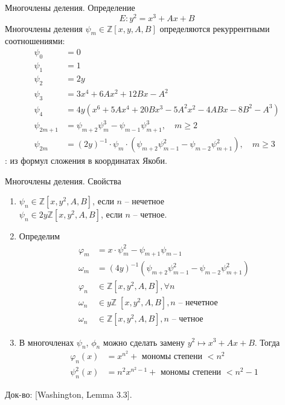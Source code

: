 \documentclass{beamer}
\begin{document}
\begin{frame}{Многочлены деления. Определение}
\[E: y^2 = x^3 + A x + B \]
Многочлены деления ${\psi _m} \in \mathbb{Z}[ {x,y,A,B}]$ определяются рекуррентными соотношениями:
\begin{align*}
    {\psi _0} &= 0 \\
    {\psi _1} &= 1 \\
    {\psi _2} &= 2y \\
    {\psi _3} &= 3{x^4} + 6A{x^2} + 12Bx - {A^2} \\
    {\psi _4} &= 4{y}\left( {{x^6} + 5A{x^4} + 20B{x^3} - 5{A^2}{x^2} - 4ABx - 8{B^2} - {A^3}} \right) \\
    {\psi _{2m + 1}} &= {\psi _{m + 2}}\psi _m^3 - {\psi _{m - 1}}\psi _{m + 1}^3, \quad m \geqslant 2 \\
    {\psi _{2m}} &= {\left( {2y} \right)^{ - 1}} \cdot {\psi _m} \cdot \left( {{\psi _{m + 2}}\psi _{m - 1}^2 - {\psi _{m - 2}}\psi _{m + 1}^2} \right),\quad m \geqslant 3
\end{align*}
: из формул сложения в координатах Якоби.
\end{frame}



\begin{frame}{Многочлены деления. Свойства}
\begin{enumerate}
    \item 
    ${\psi _n} \in \mathbb{Z}[x, y^2, A, B]$, если $n$ -- нечетное \\
    ${\psi _n} \in 2y\mathbb{Z}[x, y^2, A, B]$, если $n$ -- четное. 
    \item Определим
    \begin{align*}
        {\varphi _m} &= x \cdot \psi _m^2 - {\psi _{m + 1}}{\psi _{m - 1}} \\
        {\omega _m} &= {\left( {4y} \right)^{ - 1}}\left( {{\psi _{m + 2}}\psi _{m - 1}^2 - {\psi _{m - 2}}\psi _{m + 1}^2} \right) \\
        {\varphi _n} &\in \mathbb{Z}\left[ {x, {y^2},A,B} \right], \forall n \\
        {\omega _n} &\in y\mathbb{Z}\;\left[ {x, {y^2},A,B} \right], n{\text{  --  нечетное}} \\
        {\omega _n} &\in \mathbb{Z}\left[ {x, {y^2},A,B} \right],n{\text{ -- четное}}
    \end{align*}
    
    
    \item В многочленах ${\psi _n}$, ${\phi _n}$ можно сделать замену ${y^2} \mapsto {x^3} + Ax + B$. %
    Тогда 
    \begin{align*}
        {\varphi _n}\left( x \right) &= {x^{{n^2}}} + {\text{ мономы степени }} < {n^2} \\
        \psi _n^2\left( x \right) &= {n^2}{x^{{n^2} - 1}} + {\text{ мономы степени }} < {n^2} - 1
    \end{align*}
\end{enumerate}
Док-во: [Washington, Lemma 3.3].
\end{frame}
\end{document}

